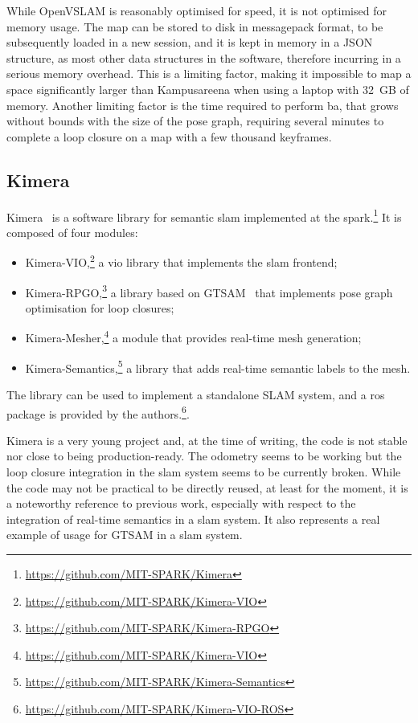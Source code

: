 \documentclass[11pt, letterpaper, twoside]{article}
\begin{document}
While OpenVSLAM is reasonably optimised for speed, it is not optimised for
memory usage. The map can be stored to disk in messagepack format, to be
subsequently loaded in a new session, and it is kept in memory in a JSON
structure, as most other data structures in the software, therefore incurring
in a serious memory overhead. This is a limiting factor, making it impossible
to map a space significantly larger than Kampusareena when using a laptop with
32~GB of memory. Another limiting factor is the time required to perform
\gls{ba}, that grows without bounds with the size of the pose graph, requiring
several minutes to complete a loop closure on a map with a few thousand
keyframes.

\subsection{Kimera}

Kimera~\cite{rosinol2019kimera} is a software library for semantic \gls{slam}
implemented at the
\gls{spark}.\footnote{\url{https://github.com/MIT-SPARK/Kimera}} It is composed
of four modules:
\begin{itemize}
    \item
        Kimera-VIO,\footnote{\url{https://github.com/MIT-SPARK/Kimera-VIO}} a
        \gls{vio} library that implements the \gls{slam} frontend;
    \item
        Kimera-RPGO,\footnote{\url{https://github.com/MIT-SPARK/Kimera-RPGO}}
        a library based on GTSAM~\cite{dellaert2006square,dellaert2012factor}
        that implements pose graph optimisation for loop closures;
    \item
        Kimera-Mesher,\footnote{\url{https://github.com/MIT-SPARK/Kimera-VIO}}
        a module that provides real-time mesh generation;
    \item
        Kimera-Semantics,\footnote{\url{https://github.com/MIT-SPARK/Kimera-Semantics}}
        a library that adds real-time semantic labels to the mesh.
\end{itemize}

The library can be used to implement a standalone SLAM system, and a \gls{ros}
package is provided by the
authors.\footnote{\url{https://github.com/MIT-SPARK/Kimera-VIO-ROS}}.

Kimera is a very young project and, at the time of writing, the code is not
stable nor close to being production-ready. The odometry seems to be working
but the loop closure integration in the \gls{slam} system seems to be currently
broken. While the code may not be practical to be directly reused, at least for
the moment, it is a noteworthy reference to previous work, especially with
respect to the integration of real-time semantics in a \gls{slam} system. It
also represents a real example of usage for GTSAM in a \gls{slam} system.
\end{document}
